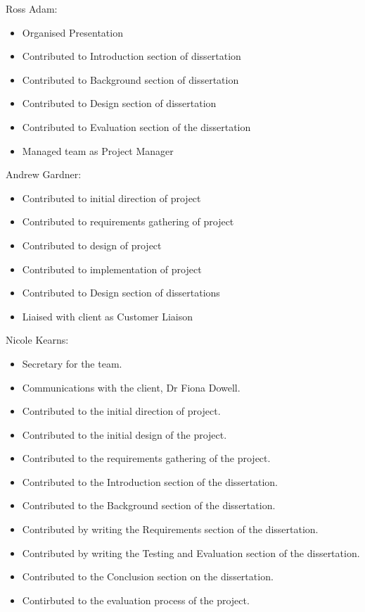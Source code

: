 Ross Adam:

\begin{itemize}
\item Organised Presentation
\item Contributed to Introduction section of dissertation
\item Contributed to Background section of dissertation
\item Contributed to Design section of dissertation
\item Contributed to Evaluation section of the dissertation
\item Managed team as Project Manager
\end{itemize}

Andrew Gardner:

\begin{itemize}
\item Contributed to initial direction of project 
\item Contributed to requirements gathering of project
\item Contributed to design of project
\item Contributed to implementation of project
\item Contributed to Design section of dissertations
\item Liaised with client as Customer Liaison
\end{itemize}

Nicole Kearns:

\begin{itemize}
\item Secretary for the team.
\item Communications with the client, Dr Fiona Dowell.
\item Contributed to the initial direction of project.
\item Contributed to the initial design of the project.
\item Contributed to the requirements gathering of the project.
\item Contributed to the Introduction section of the dissertation.
\item Contributed to the Background section of the dissertation.
\item Contributed by writing the Requirements section of the dissertation.
\item Contributed by writing the Testing and Evaluation section of the dissertation.
\item Contributed to the Conclusion section on the dissertation.
\item Contirbuted to the evaluation process of the project.
\end{itemize}


